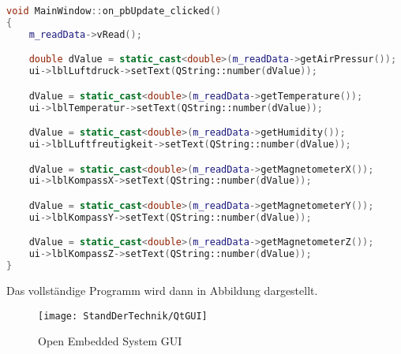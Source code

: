 \begin{lstlisting}[language=C++, caption=Update Button Slot,
    label=lst:updateSlot]
void MainWindow::on_pbUpdate_clicked()
{
    m_readData->vRead();

    double dValue = static_cast<double>(m_readData->getAirPressur());
    ui->lblLuftdruck->setText(QString::number(dValue));

    dValue = static_cast<double>(m_readData->getTemperature());
    ui->lblTemperatur->setText(QString::number(dValue));

    dValue = static_cast<double>(m_readData->getHumidity());
    ui->lblLuftfreutigkeit->setText(QString::number(dValue));

    dValue = static_cast<double>(m_readData->getMagnetometerX());
    ui->lblKompassX->setText(QString::number(dValue));

    dValue = static_cast<double>(m_readData->getMagnetometerY());
    ui->lblKompassY->setText(QString::number(dValue));

    dValue = static_cast<double>(m_readData->getMagnetometerZ());
    ui->lblKompassZ->setText(QString::number(dValue));
}

\end{lstlisting}

Das vollständige Programm wird dann in Abbildung  dargestellt.

\begin{figure}[h]
    \centering
    \texttt{[image: StandDerTechnik/QtGUI]}
    \caption[Open Embedded System GUI]{Open Embedded System GUI}
    \label{img:qtGui}
\end{figure}
